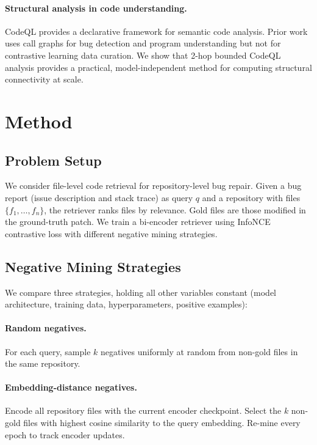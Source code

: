 \documentclass[11pt,a4paper]{article}
\begin{document}
\paragraph{Structural analysis in code understanding.}
CodeQL \cite{codeql} provides a declarative framework for semantic code analysis.
Prior work uses call graphs for bug detection and program understanding but not for contrastive learning data curation.
We show that 2-hop bounded CodeQL analysis provides a practical, model-independent method for computing structural connectivity at scale.

\section{Method}
\label{sec:method}

\subsection{Problem Setup}

We consider file-level code retrieval for repository-level bug repair.
Given a bug report (issue description and stack trace) as query $q$ and a repository with files $\{f_1, \ldots, f_n\}$, the retriever ranks files by relevance.
Gold files are those modified in the ground-truth patch.
We train a bi-encoder retriever using InfoNCE contrastive loss with different negative mining strategies.

\subsection{Negative Mining Strategies}

We compare three strategies, holding all other variables constant (model architecture, training data, hyperparameters, positive examples):

\paragraph{Random negatives.} For each query, sample $k$ negatives uniformly at random from non-gold files in the same repository.

\paragraph{Embedding-distance negatives.} Encode all repository files with the current encoder checkpoint. Select the $k$ non-gold files with highest cosine similarity to the query embedding. Re-mine every epoch to track encoder updates.
\end{document}
